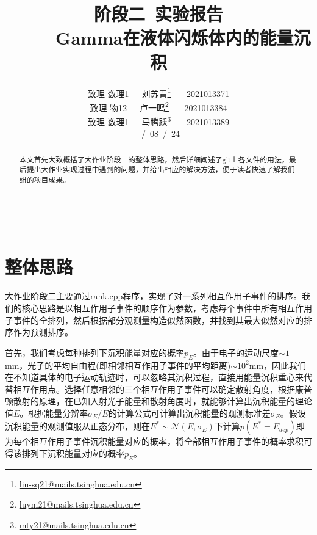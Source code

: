 \documentclass[12pt,a4paper]{article}%
\title{\fontsize{24pt}{24pt}\selectfont%
	{\heiti%
		阶段二~实验报告}\\[0.5ex] %
	{\fontsize{16pt}{24pt}\selectfont%
		\heiti——~Gamma在液体闪烁体内的能量沉积}}%
\author{\fontsize{12pt}{18pt}\selectfont%
	{\fangsong%
		致理-数理1~~~刘苏青}\thanks{\href{mailto:liu-sq21@mails.tsinghua.edu.cn}{liu-sq21@mails.tsinghua.edu.cn}}%
        {\fangsong
        ~~~2021013371}\\
        {\fontsize{12pt}{18pt}\selectfont
        {\fangsong
        致理-物12~~~卢一鸣\thanks{\href{mailto:luym21@mails.tsinghua.edu.cn}{luym21@mails.tsinghua.edu.cn}}}
        {\fangsong
        ~~~2021013384}}\\
        {\fontsize{12pt}{18pt}\selectfont
        {\fangsong
        致理-数理1~~~马腾跃\thanks{\href{mailto:mty21@mails.tsinghua.edu.cn}{mty21@mails.tsinghua.edu.cn}}}
        {\fangsong
        ~~~2021013389}}\\
	\fontsize{10.5pt}{15.75pt}\selectfont%
	{\fangsong%
		2023~/~08~/~24}}
\date{}%
\begin{document}
	\maketitle%
	\lhead{}%
	\chead{}%
	\rhead{}%
	\lfoot{}%
	\cfoot{\thepage}%
	\rfoot{}%
	\begin{abstract}
		\fangsong 本文首先大致概括了大作业阶段二的整体思路，然后详细阐述了git上各文件的用法，最后提出大作业实现过程中遇到的问题，并给出相应的解决方法，便于读者快速了解我们组的项目成果。
	\end{abstract}
	
	\begin{adjustwidth}{1.06cm}{1.06cm}
		\fontsize{10.5pt}{15.75pt}\\
	\end{adjustwidth}
 
	\iffalse
	\begin{center}%
		{\textbf{Abstract}}%
	\end{center}
	\begin{adjustwidth}{1.06cm}{1.06cm}%
		\hspace{1.5em}Attention！If you input "dif{}ferent", the computer will output "different", but if you input "dif\{\}ferent", the computer will output "dif{}ferent"
	\end{adjustwidth}
        \fi
	\newpage
        \tableofcontents
        \newpage


\section{整体思路}
    大作业阶段二主要通过rank.cpp程序，实现了对一系列相互作用子事件的排序。我们的核心思路是以相互作用子事件的顺序作为参数，考虑每个事件中所有相互作用子事件的全排列，然后根据部分观测量构造似然函数，并找到其最大似然对应的排序作为预测排序。
    
    首先，我们考虑每种排列下沉积能量对应的概率$p_E$。由于电子的运动尺度$\sim 1$mm，光子的平均自由程(即相邻相互作用子事件的平均距离)$\sim 10^2$mm，因此我们在不知道具体的电子运动轨迹时，可以忽略其沉积过程，直接用能量沉积重心来代替相互作用点。选择任意相邻的三个相互作用子事件可以确定散射角度，根据康普顿散射的原理，在已知入射光子能量和散射角度时，就能够计算出沉积能量的理论值$E$。根据能量分辨率$\sigma_E/E$的计算公式可计算出沉积能量的观测标准差$\sigma_E$。假设沉积能量的观测值服从正态分布，则在$E^*\sim \mathcal N(E, \sigma_E)$下计算$p(E^*=E_{dep})$即为每个相互作用子事件沉积能量对应的概率，将全部相互作用子事件的概率求积可得该排列下沉积能量对应的概率$p_E$。
\end{document}

